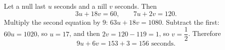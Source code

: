 Let a null last $u$ seconds and a nill $v$ seconds. Then
\[
3u+18v=60,\qquad 7u+2v=120 .
\]
Multiply the second equation by $9$: $63u+18v=1080$. Subtract the first: $60u=1020$, so $u=17$, and then $2v=120-119=1$, so $v=\dfrac{1}{2}$. Therefore
\[
9u+6v=153+3=\boxed{156}\text{ seconds}.
\]
